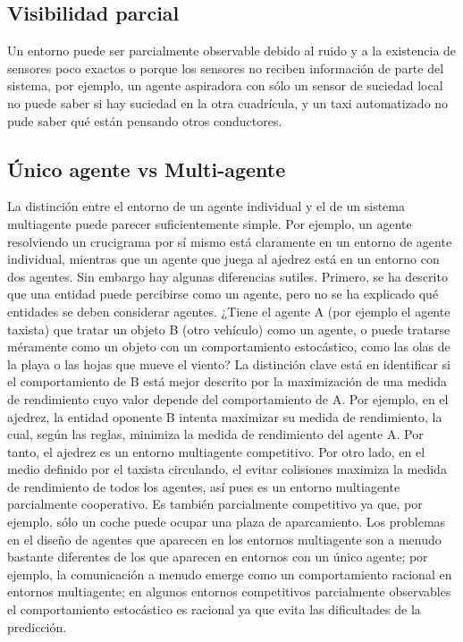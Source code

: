 \documentclass[12pt,a4paper]{report}
\begin{document}
\subsection*{Visibilidad parcial}
Un entorno puede ser parcialmente observable debido al ruido y a la existencia de sensores poco exactos o porque los sensores no reciben información de parte del sistema, por ejemplo, un agente aspiradora con sólo un sensor de suciedad local no puede saber si hay suciedad en la otra cuadrícula, y un taxi automatizado no pude saber qué están pensando otros conductores.
\subsection*{Único agente vs Multi-agente}
La distinción entre el entorno de un agente individual y el de un sistema multiagente puede parecer suficientemente simple. Por ejemplo, un agente resolviendo un crucigrama por sí mismo está claramente en un entorno de agente individual, mientras que un agente que juega al ajedrez está en un entorno con dos agentes. Sin embargo hay algunas diferencias sutiles. Primero, se ha descrito que una entidad puede percibirse como un agente, pero no se ha explicado qué entidades se deben considerar agentes. ¿Tiene el agente A (por ejemplo el agente taxista) que tratar un objeto B (otro vehículo) como un agente, o puede tratarse méramente como un objeto con un comportamiento estocástico, como las olas de la playa o las hojas que mueve el viento? La distinción clave está en identificar si el comportamiento de B está mejor descrito por la maximización de una medida de rendimiento cuyo valor depende del comportamiento de A. Por ejemplo, en el ajedrez, la entidad oponente B intenta maximizar su medida de rendimiento, la cual, según las reglas, minimiza la medida de rendimiento del agente A. Por tanto, el ajedrez es un entorno multiagente competitivo. Por otro lado, en el medio definido por el taxista circulando, el evitar colisiones maximiza la medida de rendimiento de todos los agentes, así pues es un entorno multiagente parcialmente cooperativo. Es también parcialmente competitivo ya que, por ejemplo, sólo un coche puede ocupar una plaza de aparcamiento. Los problemas en el diseño de agentes que aparecen en los entornos multiagente son a menudo bastante diferentes de los que aparecen en entornos con un único agente; por ejemplo, la comunicación a menudo emerge como un comportamiento racional en entornos multiagente; en algunos entornos competitivos parcialmente observables el comportamiento estocástico es racional ya que evita las dificultades de la predicción.
\end{document}
